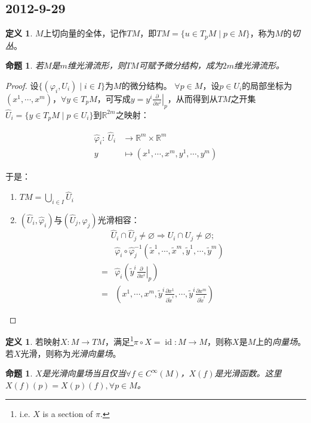 \documentclass[winfonts,UTF8,c5size,a4paper,fancyhdr,hyperref,titlepage,nocap]{ctexart}
\newtheorem{prop}[thm]{命题}
\theoremstyle{definition}
\newtheorem{defn}[thm]{定义}
\theoremstyle{remark}
\numberwithin{equation}{subsection}
\newcommand{\Real}{\mathbb{R}}
\newcommand{\red}{\color{red}}
\newcommand{\pfrac}[2]{\frac{\partial{#1}}{\partial{#2}}}
\newcommand{\px}[1]{\left.\pfrac{}{x^{#1}}\right|_p}
\newcommand{\mapdes}[5]
  {
    \begin{align*}
      #1\colon\  #2 & \longrightarrow  #3 \\
            #4 & \mapsto  #5
    \end{align*}
  }
\newcommand{\id}{\operatorname{id}}
\begin{document}
\subsection*{2012-9-29}
\begin{defn}
  $M$上切向量的全体，记作$TM$，即$TM=\{u\in T_pM\mid p\in M\}$，称为$M$的\emph{\red 切丛}。
\end{defn}
\begin{prop}
  若$M$是$m$维光滑流形，则$TM$可赋予微分结构，成为$2m$维光滑流形。
\end{prop}
\begin{proof}
设$\{(\varphi_i,U_i)\mid i\in I\}$为$M$的微分结构。
$\forall p\in M$，设$p\in U_i$的局部坐标为$(x^1,\cdots,x^m)$，$\forall y\in T_pM$，可写成$y=y^i\px{i}$，从而得到从$TM$之开集$\widehat{U}_i=\{y\in T_pM\mid p\in U_i\}$到$\Real^{2m}$之映射：
\mapdes{\widehat{\varphi}_i}{\widehat{U}_i}{\Real^m\times\Real^m}{y}{(x^1,\cdots,x^m,y^1,\cdots,y^m)}
于是：
\begin{enumerate}[1)]
    \setlength{\itemindent}{2ex}
    \item $TM=\bigcup_{i\in I}\widehat{U}_i$
    \item $(\widehat{U}_i,\widehat{\varphi}_i)$与$(\widehat{U}_j,\widehat{\varphi}_j)$光滑相容：
\begin{equation*}
    \widehat{U}_i\cap\widehat{U}_j\neq\varnothing\Longrightarrow U_i\cap U_j\neq\varnothing;
\end{equation*}
        \begin{align*}
   &\widehat{\varphi}_i\circ\widehat{\varphi}_j^{-1}(\widetilde{x}^1,\cdots,\widetilde{x}^m,\widetilde{y}^1,\cdots,\widetilde{y}^m)\\
=&\widehat{\varphi}_i(\widetilde{y}^i\px{i})\\
=&(x^1,\cdots,x^m,\widetilde{y}^i\pfrac{x^1}{\widetilde{x}^i},\cdots,\widetilde{y}^i\pfrac{x^m}{\widetilde{x}^i})
        \end{align*}
  \end{enumerate}
\end{proof}
\begin{defn}
  若映射$X\colon M\to TM$，满足\footnote{i.e. $X$ is a section of $\pi$.}$\pi\circ X=\id\colon M\to M$，则称$X$是$M$上的\emph{\red 向量场}。
  若$X$光滑，则称为\emph{\red 光滑向量场}。
\end{defn}
\begin{prop}
  $X$是光滑向量场当且仅当$\forall f\in C^{\infty}(M)$，$X(f)$是光滑函数。这里$X(f)(p)=X(p)(f),\forall p\in M$。
\end{prop}
\end{document}
